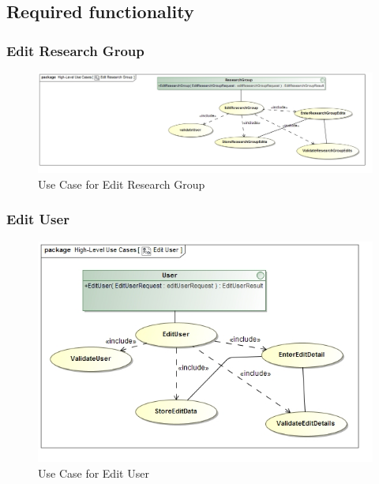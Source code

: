 \documentclass[a4paper,10pt]{article}
\begin{document}
\subsection{Required functionality}

\subsubsection{Edit Research Group}
	\begin{figure}[h]
		\includegraphics[scale=0.5]{UseEditResearchGroup}
	\caption{Use Case for Edit Research Group}
	\end{figure}
	
\subsubsection{Edit User}
	\begin{figure}[h]
		\includegraphics[scale=0.5]{UseEditUser}
	\caption{Use Case for Edit User}
	\end{figure}
		
\end{document}

